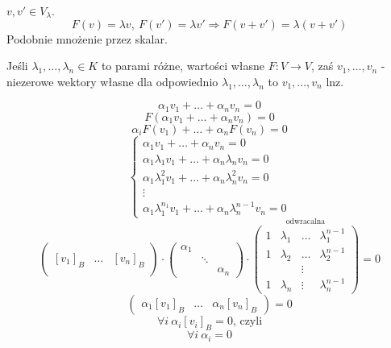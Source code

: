 \begin{dd} 
    $v,v' \in V_\lambda$.
    $$ F(v) = \lambda v,\ F(v') = \lambda v' \Rightarrow F(v+v') = \lambda (v+v')$$
    Podobnie mnożenie przez skalar.
\end{dd} 

\begin{ft} 
    Jeśli $\lambda_1, \dots, \lambda_n \in K $ to parami różne, wartości własne $F: V \rightarrow V$, zaś $v_1,\dots,v_n$ - niezerowe wektory własne dla odpowiednio $\lambda_1, \dots, \lambda_n $ to $v_1,\dots,v_n$ lnz. 
\end{ft}

\begin{dd} 
    $$ \alpha_1 v_1 + \ldots + \alpha_n v_n = 0 $$ 
    $$ F(\alpha_1 v_1 + \ldots + \alpha_n v_n) = 0$$ 
    $$ \alpha_i F(v_1) + \ldots + \alpha_n F(v_n) = 0 $$ 
    $$ \left\{ 
        \begin{array}{l}
            \alpha_1 v_1 + \ldots + \alpha_n v_n = 0 \\ 
            \alpha_1 \lambda_1 v_1 + \ldots + \alpha_n \lambda _n v_n = 0 \\ 
            \alpha_1 \lambda_1^2 v_1 + \ldots + \alpha_n \lambda_n^2 v_n = 0 \\ 
            \vdots \\ 
            \alpha_1 \lambda_1^{n_1} v_1 + \ldots + \alpha_n \lambda_n^{n-1} v_n = 0
        \end{array}
    \right.$$
    $$
    \begin{pmatrix} 
        & &  \\
        [v_1]_B & \ldots & [v_n]_B \\
        & &  
    \end{pmatrix} 
    \cdot 
    \begin{pmatrix} 
        \alpha_1  & &\\
        & \ddots &\\ 
        &  & \alpha_n
    \end{pmatrix} 
    \cdot 
    \overset{\text{odwracalna}}{
    \begin{pmatrix} 
        1 & \lambda_1 & \ldots & \lambda_1^{n-1}\\ 
        1 & \lambda_2 & \ldots & \lambda_2^{n-1}\\
          & & \vdots & \\
        1 & \lambda_n & \vdots & \lambda_n^{n-1}
\end{pmatrix}}
    = 
    0 
    $$
    $$
    \begin{pmatrix} 
        \alpha_1 [v_1]_B & \ldots & \alpha_n [v_n]_B
    \end{pmatrix} 
    = 0
    $$ 
    $$ \forall i \ \alpha_i [v_i]_B = 0 \text{, czyli} $$
    $$ \forall i \ \alpha_i = 0$$
\end{dd} 

